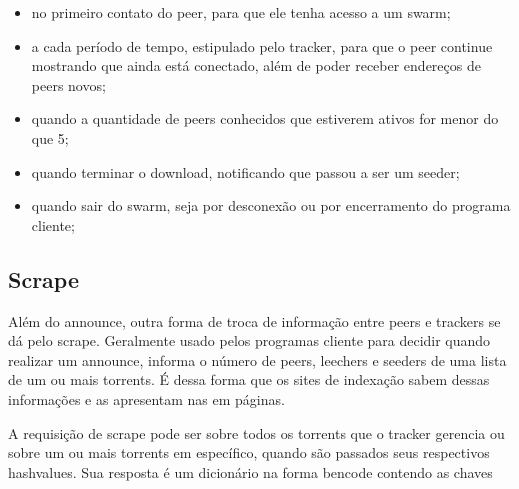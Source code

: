 \begin{itemize}
    \item no primeiro contato do \gls*{peer}, para que ele tenha acesso a um
        \gls*{swarm};

    \item a cada período de tempo, estipulado pelo tracker, para que o \gls*{peer}
        continue mostrando que ainda está conectado, além de poder receber endereços de
        \glspl*{peer} novos;

    \item quando a quantidade de \glspl*{peer} conhecidos que estiverem ativos for
        menor do que 5;

    \item quando terminar o download, notificando que passou a ser um \gls*{seeder};

    \item quando sair do \gls*{swarm}, seja por desconexão ou por encerramento do
        programa cliente;
\end{itemize}

\subsection*{Scrape}

Além do \gls*{announce}, outra forma de troca de informação entre \glspl*{peer} e
\glspl*{tracker} se dá pelo \gls{scrape}. Geralmente usado pelos programas cliente para
decidir quando realizar um \gls*{announce}, informa o número de \glspl*{peer},
\glspl*{leecher} e \glspl*{seeder} de uma lista de um ou mais \glspl*{torrent}. É dessa
forma que os sites de indexação sabem dessas informações e as apresentam nas em páginas.

A requisição de \gls*{scrape} pode ser sobre todos os \glspl*{torrent} que o
\gls*{tracker} gerencia ou sobre um ou mais \glspl*{torrent} em específico, quando são
passados seus respectivos \glspl*{hashvalue}. Sua resposta é um dicionário na forma
\gls*{bencode} contendo as chaves


